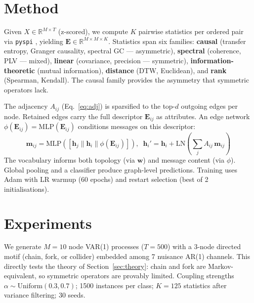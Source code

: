 \documentclass{article}
\theoremstyle{plain}
\begin{document}
\section{Method}
\label{sec:method}

Given $X \in \mathbb{R}^{M \times T}$ (z-scored), we compute $K$ pairwise statistics per ordered pair via \texttt{pyspi} \citep{cliff2023}, yielding $\mathbf{E} \in \mathbb{R}^{M \times M \times K}$. Statistics span six families: \textbf{causal} (transfer entropy, Granger causality, spectral GC --- asymmetric), \textbf{spectral} (coherence, PLV --- mixed), \textbf{linear} (covariance, precision --- symmetric), \textbf{information-theoretic} (mutual information), \textbf{distance} (DTW, Euclidean), and \textbf{rank} (Spearman, Kendall). The causal family provides the asymmetry that symmetric operators lack.

The adjacency $A_{ij}$ (Eq.~\ref{eq:adj}) is sparsified to the top-$d$ outgoing edges per node. Retained edges carry the full descriptor $\mathbf{E}_{ij}$ as attributes. An edge network $\phi(\mathbf{E}_{ij}) = \mathrm{MLP}(\mathbf{E}_{ij})$ conditions messages on this descriptor:
%
\begin{equation}
\mathbf{m}_{ij} = \mathrm{MLP}\!\left([\mathbf{h}_j \| \mathbf{h}_i \| \phi(\mathbf{E}_{ij})]\right), \;\; \mathbf{h}_i' = \mathbf{h}_i + \mathrm{LN}\!\left(\textstyle\sum_j A_{ij}\,\mathbf{m}_{ij}\right)
\end{equation}
%
The vocabulary informs both topology (via $\mathbf{w}$) and message content (via $\phi$). Global pooling and a classifier produce graph-level predictions. Training uses Adam with LR warmup (60 epochs) and restart selection (best of 2 initialisations).

\section{Experiments}
\label{sec:experiments}

We generate $M{=}10$ node VAR(1) processes ($T{=}500$) with a 3-node directed motif (chain, fork, or collider) embedded among 7 nuisance AR(1) channels. This directly tests the theory of Section~\ref{sec:theory}: chain and fork are Markov-equivalent, so symmetric operators are provably limited. Coupling strengths $\alpha \sim \mathrm{Uniform}(0.3, 0.7)$; 1500 instances per class; $K{=}125$ statistics after variance filtering; 30 seeds.
\end{document}
